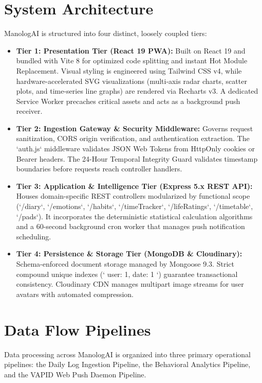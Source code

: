 \section{System Architecture}

ManologAI is structured into four distinct, loosely coupled tiers:

\begin{itemize}
  \item \textbf{Tier 1: Presentation Tier (React 19 PWA):} Built on React 19 and bundled with Vite 8 for optimized code splitting and instant Hot Module Replacement. Visual styling is engineered using Tailwind CSS v4, while hardware-accelerated SVG visualizations (multi-axis radar charts, scatter plots, and time-series line graphs) are rendered via Recharts v3. A dedicated Service Worker precaches critical assets and acts as a background push receiver.
  \item \textbf{Tier 2: Ingestion Gateway \& Security Middleware:} Governs request sanitization, CORS origin verification, and authentication extraction. The `auth.js` middleware validates JSON Web Tokens from HttpOnly cookies or Bearer headers. The 24-Hour Temporal Integrity Guard validates timestamp boundaries before requests reach controller handlers.
  \item \textbf{Tier 3: Application \& Intelligence Tier (Express 5.x REST API):} Houses domain-specific REST controllers modularized by functional scope (`/diary`, `/emotions`, `/habits`, `/timeTracker`, `/lifeRatings`, `/timetable`, `/pads`). It incorporates the deterministic statistical calculation algorithms and a 60-second background cron worker that manages push notification scheduling.
  \item \textbf{Tier 4: Persistence \& Storage Tier (MongoDB \& Cloudinary):} Schema-enforced document storage managed by Mongoose 9.3. Strict compound unique indexes (`{ user: 1, date: 1 }`) guarantee transactional consistency. Cloudinary CDN manages multipart image streams for user avatars with automated compression.
\end{itemize}

\section{Data Flow Pipelines}

Data processing across ManologAI is organized into three primary operational pipelines: the Daily Log Ingestion Pipeline, the Behavioral Analytics Pipeline, and the VAPID Web Push Daemon Pipeline.

